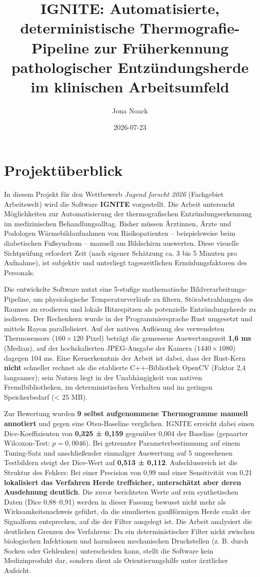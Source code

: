 \documentclass[
  11pt,
]{article}
\title{IGNITE: Automatisierte, deterministische Thermografie-Pipeline
zur Früherkennung pathologischer Entzündungsherde im klinischen
Arbeitsumfeld}
\author{Jona Noack}
\date{2026-07-23}
\begin{document}
\maketitle

\section{Projektüberblick}\label{projektuxfcberblick}

In diesem Projekt für den Wettbewerb \emph{Jugend forscht 2026}
(Fachgebiet Arbeitswelt) wird die Software \textbf{IGNITE} vorgestellt.
Die Arbeit untersucht Möglichkeiten zur Automatisierung der
thermografischen Entzündungserkennung im medizinischen
Behandlungsalltag. Bisher müssen Ärztinnen, Ärzte und Podologen
Wärmebildaufnahmen von Risikopatienten -- beispielsweise beim
diabetischen Fußsyndrom -- manuell am Bildschirm auswerten. Diese
visuelle Sichtprüfung erfordert Zeit (nach eigener Schätzung ca. 3 bis 5
Minuten pro Aufnahme), ist subjektiv und unterliegt tageszeitlichen
Ermüdungsfaktoren des Personals.

Die entwickelte Software nutzt eine 5-stufige mathematische
Bildverarbeitungs-Pipeline, um physiologische Temperaturverläufe zu
filtern, Störabstrahlungen des Raumes zu erodieren und lokale
Hitzespitzen als potenzielle Entzündungsherde zu isolieren. Der
Rechenkern wurde in der Programmiersprache Rust umgesetzt und mittels
Rayon parallelisiert. Auf der nativen Auflösung des verwendeten
Thermosensors (\(160 \times 120\) Pixel) beträgt die gemessene
Auswertungszeit \textbf{1,6 ms} (Median), auf der hochskalierten
JPEG-Ausgabe der Kamera (\(1440 \times 1080\)) dagegen 104 ms. Eine
Kernerkenntnis der Arbeit ist dabei, dass der Rust-Kern \textbf{nicht}
schneller rechnet als die etablierte C++-Bibliothek OpenCV (Faktor 2,4
langsamer); sein Nutzen liegt in der Unabhängigkeit von nativen
Fremdbibliotheken, im deterministischen Verhalten und im geringen
Speicherbedarf (\textless{} 25 MB).

Zur Bewertung wurden \textbf{9 selbst aufgenommene Thermogramme manuell
annotiert} und gegen eine Otsu-Baseline verglichen. IGNITE erreicht
dabei einen Dice-Koeffizienten von \textbf{0,325 ± 0,159} gegenüber
0,004 der Baseline (gepaarter Wilcoxon-Test: \(p = 0{,}0046\)). Bei
getrennter Parameterbestimmung auf einem Tuning-Satz und anschließender
einmaliger Auswertung auf 5 ungesehenen Testbildern steigt der Dice-Wert
auf \textbf{0,513 ± 0,112}. Aufschlussreich ist die Struktur des
Fehlers: Bei einer Precision von 0,99 und einer Sensitivität von 0,21
\textbf{lokalisiert das Verfahren Herde treffsicher, unterschätzt aber
deren Ausdehnung deutlich}. Die zuvor berichteten Werte auf rein
synthetischen Daten (Dice 0,88--0,91) werden in dieser Fassung bewusst
nicht mehr als Wirksamkeitsnachweis geführt, da die simulierten
gaußförmigen Herde exakt der Signalform entsprechen, auf die der Filter
ausgelegt ist. Die Arbeit analysiert die deutlichen Grenzen des
Verfahrens: Da ein deterministischer Filter nicht zwischen biologischen
Infektionen und harmlosen mechanischen Druckstellen (z. B. durch Socken
oder Gehlenken) unterscheiden kann, stellt die Software kein
Medizinprodukt dar, sondern dient als Orientierungshilfe unter
ärztlicher Aufsicht.
\end{document}
